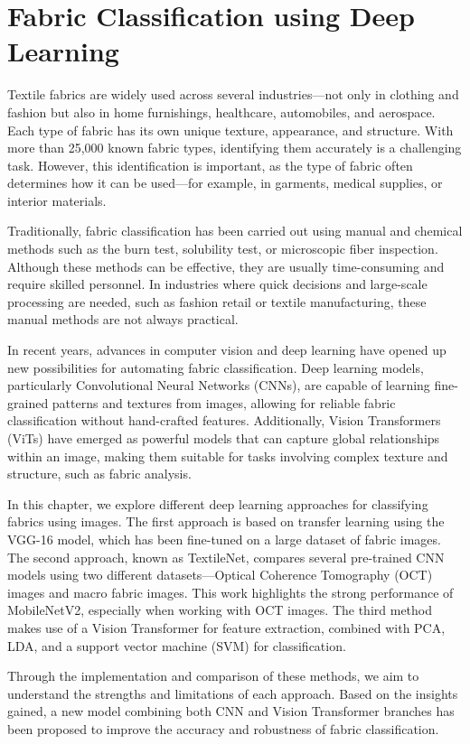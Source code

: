 \chapter{Fabric Classification using Deep Learning}

Textile fabrics are widely used across several industries—not only in clothing and fashion but also in home furnishings, healthcare, automobiles, and aerospace. Each type of fabric has its own unique texture, appearance, and structure. With more than 25,000 known fabric types, identifying them accurately is a challenging task. However, this identification is important, as the type of fabric often determines how it can be used—for example, in garments, medical supplies, or interior materials.

Traditionally, fabric classification has been carried out using manual and chemical methods such as the burn test, solubility test, or microscopic fiber inspection. Although these methods can be effective, they are usually time-consuming and require skilled personnel. In industries where quick decisions and large-scale processing are needed, such as fashion retail or textile manufacturing, these manual methods are not always practical.

In recent years, advances in computer vision and deep learning have opened up new possibilities for automating fabric classification. Deep learning models, particularly Convolutional Neural Networks (CNNs), are capable of learning fine-grained patterns and textures from images, allowing for reliable fabric classification without hand-crafted features. Additionally, Vision Transformers (ViTs) have emerged as powerful models that can capture global relationships within an image, making them suitable for tasks involving complex texture and structure, such as fabric analysis.

In this chapter, we explore different deep learning approaches for classifying fabrics using images. The first approach is based on transfer learning using the VGG-16 model, which has been fine-tuned on a large dataset of fabric images. The second approach, known as TextileNet, compares several pre-trained CNN models using two different datasets—Optical Coherence Tomography (OCT) images and macro fabric images. This work highlights the strong performance of MobileNetV2, especially when working with OCT images. The third method makes use of a Vision Transformer for feature extraction, combined with PCA, LDA, and a support vector machine (SVM) for classification.

Through the implementation and comparison of these methods, we aim to understand the strengths and limitations of each approach. Based on the insights gained, a new model combining both CNN and Vision Transformer branches has been proposed to improve the accuracy and robustness of fabric classification.

